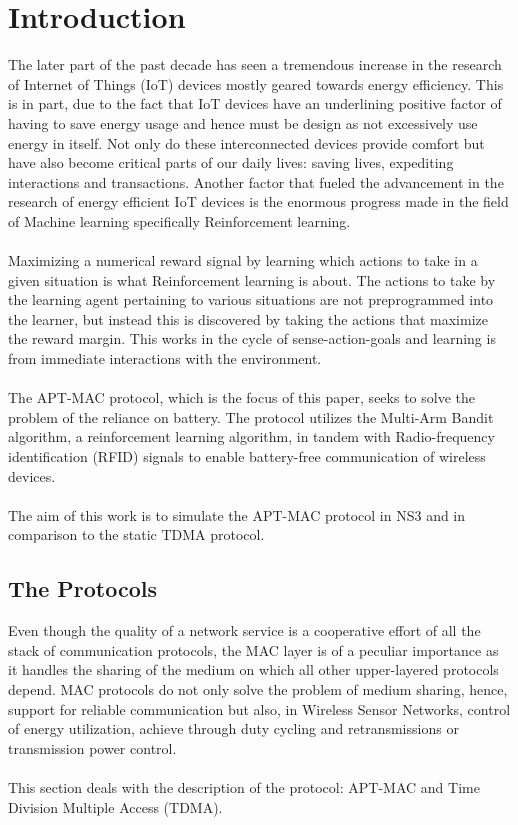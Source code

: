 \chapter{Introduction}

The later part of the past decade has seen a tremendous increase in the research of Internet of Things (IoT) devices mostly geared towards energy efficiency.
This is in part, due to the fact that IoT devices have an underlining positive factor of having to save energy usage and hence must be design as not excessively use energy in itself.
Not only do these interconnected devices provide comfort but have also become critical parts of our daily lives: saving lives, expediting interactions and transactions.
Another factor that fueled the advancement in the research of energy efficient IoT devices is the enormous progress made in the field of Machine learning specifically Reinforcement learning.\\\\
Maximizing a numerical reward signal by learning which actions to take in a given situation is what Reinforcement learning is about.
The actions to take by the learning agent pertaining to various situations are not preprogrammed into the learner, but instead this is discovered by taking the actions that maximize the reward margin\cite{Sutton&Barto}. This works in the cycle of sense-action-goals and learning is from immediate interactions with the environment.\\\\
The APT-MAC protocol, which is the focus of this paper, seeks to solve the problem of the reliance on battery.
The protocol utilizes the Multi-Arm Bandit algorithm, a reinforcement learning algorithm, in tandem with Radio-frequency identification (RFID) signals to enable battery-free communication of wireless devices\cite{Maselli}.\\\\
The aim of this work is to simulate the APT-MAC protocol in NS3 and in comparison to the static TDMA protocol.

\section{The Protocols}
Even though the quality of a network service is a cooperative effort of all the stack of communication protocols, the MAC layer is of a peculiar importance as it handles the sharing of the medium on which all other upper-layered protocols depend.
MAC protocols do not only solve the problem of medium sharing, hence, support for reliable communication but also, in Wireless Sensor Networks, control of energy utilization, achieve through duty cycling and retransmissions or transmission power control\cite{Yigitel&Durmaz&Ersoy}.\\\\
This section deals with the description of the protocol: APT-MAC and Time Division Multiple Access (TDMA).

